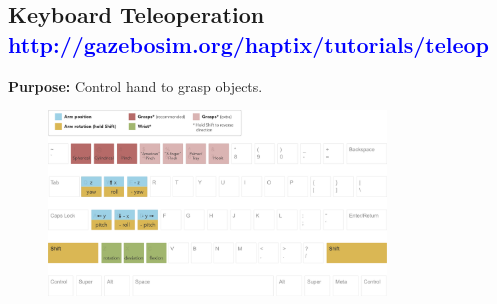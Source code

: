 \documentclass[11pt, letterpaper, landscape]{article}
\begin{document}
\begin{minipage}[t]{0.98\textwidth}
  \begin{tcolorbox}[colback=gray!8,colframe=gray!15]

    \section*{Keyboard Teleoperation \textcolor{blue}{\textnormal{\small http://gazebosim.org/haptix/tutorials/teleop}}}
      {\bf Purpose:} Control hand to grasp objects.\\

    \begin{figure}[H]
      \centering
      \includegraphics[width=0.8\textwidth]{figures/keyboard.png}
    \end{figure}
  \end{tcolorbox}
\end{minipage}
\end{document}
